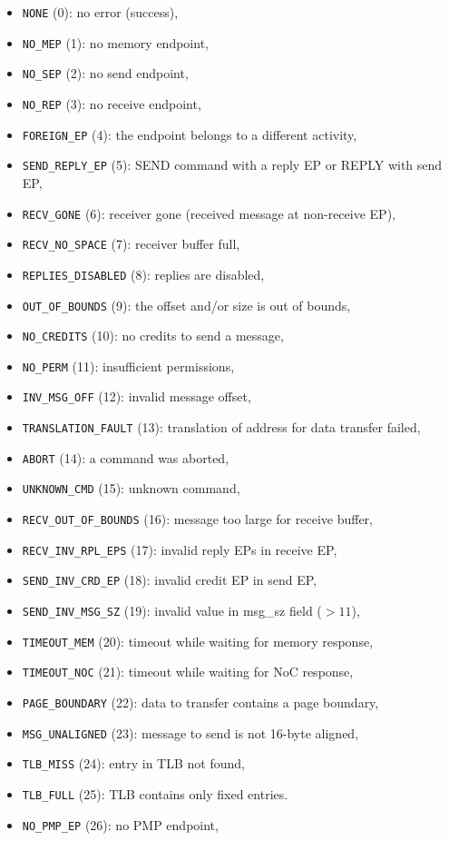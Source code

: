 \begin{itemize}
  \item \texttt{NONE} (0): no error (success),
  \item \texttt{NO\_MEP} (1): no memory endpoint,
  \item \texttt{NO\_SEP} (2): no send endpoint,
  \item \texttt{NO\_REP} (3): no receive endpoint,
  \item \texttt{FOREIGN\_EP} (4): the endpoint belongs to a different activity,
  \item \texttt{SEND\_REPLY\_EP} (5): SEND command with a reply EP or REPLY with send EP,
  \item \texttt{RECV\_GONE} (6): receiver gone (received message at non-receive EP),
  \item \texttt{RECV\_NO\_SPACE} (7): receiver buffer full,
  \item \texttt{REPLIES\_DISABLED} (8): replies are disabled,
  \item \texttt{OUT\_OF\_BOUNDS} (9): the offset and/or size is out of bounds,
  \item \texttt{NO\_CREDITS} (10): no credits to send a message,
  \item \texttt{NO\_PERM} (11): insufficient permissions,
  \item \texttt{INV\_MSG\_OFF} (12): invalid message offset,
  \item \texttt{TRANSLATION\_FAULT} (13): translation of address for data transfer failed,
  \item \texttt{ABORT} (14): a command was aborted,
  \item \texttt{UNKNOWN\_CMD} (15): unknown command,
  \item \texttt{RECV\_OUT\_OF\_BOUNDS} (16): message too large for receive buffer,
  \item \texttt{RECV\_INV\_RPL\_EPS} (17): invalid reply EPs in receive EP,
  \item \texttt{SEND\_INV\_CRD\_EP} (18): invalid credit EP in send EP,
  \item \texttt{SEND\_INV\_MSG\_SZ} (19): invalid value in msg\_sz field ($> 11$),
  \item \texttt{TIMEOUT\_MEM} (20): timeout while waiting for memory response,
  \item \texttt{TIMEOUT\_NOC} (21): timeout while waiting for NoC response,
  \item \texttt{PAGE\_BOUNDARY} (22): data to transfer contains a page boundary,
  \item \texttt{MSG\_UNALIGNED} (23): message to send is not 16-byte aligned,
  \item \texttt{TLB\_MISS} (24): entry in TLB not found,
  \item \texttt{TLB\_FULL} (25): TLB contains only fixed entries.
  \item \texttt{NO\_PMP\_EP} (26): no PMP endpoint,
\end{itemize}
